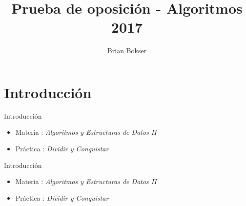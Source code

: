 \documentclass[pdf]{beamer}
\title[Prueba de oposición] %
{Prueba de oposición - Algoritmos 2017}
\author[Brian Bokser] %
{Brian Bokser}
\institute[UBA-FCEN] %
{
  Facultad de Ciencias Exactas y Naturales\\
  Universidad de Buenos Aires
}
\begin{document}
\begin{frame}
  \titlepage
\end{frame}



\section{Introducci\'on}

\begin{frame}{Introducci\'on}
    \begin{itemize}
	\item Materia :  \emph{Algoritmos y Estructuras de Datos II}
	\vspace{2em}
	\item Práctica : \emph{Dividir y Conquistar}

    \end{itemize}

\end{frame}


\begin{frame}{Introducción}
    \begin{itemize}
    \item Materia :  \emph{Algoritmos y Estructuras de Datos II}
    \vspace{2em}
    \item Práctica : \emph{Dividir y Conquistar}

    \end{itemize}

\end{frame}
\end{document}
